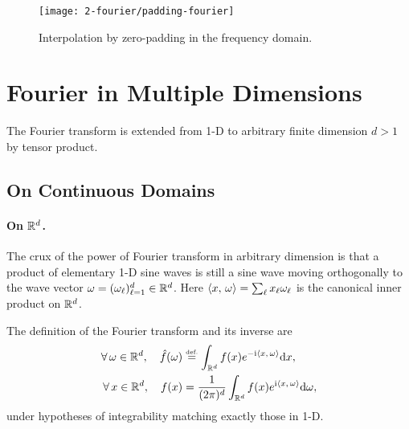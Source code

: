 \begin{figure}
\centering
\texttt{[image: 2-fourier/padding-fourier]}
\caption{\label{fig-padding-fourier}
Interpolation by zero-padding in the frequency domain.
}
\end{figure}

\section{Fourier in Multiple Dimensions}
\label{sec-fourier-multiple-dim}

The Fourier transform is extended from 1-D to arbitrary finite dimension $d>1$ by tensor product. 


\subsection{On Continuous Domains}

\paragraph{On $\mathbb{R}^d$.}

The crux of the power of Fourier transform in arbitrary dimension is that a product of elementary 1-D sine waves is still a sine wave
moving orthogonally to the wave vector $\omega=(\omega_\ell)_{\ell=1}^d \in \mathbb{R}^d$. Here $\langle x,\,\omega\rangle = \sum_\ell x_\ell \omega_\ell$ is the canonical inner product on $\mathbb{R}^d$. 

The definition of the Fourier transform and its inverse are 
\begin{align*}
	\forall \, \omega \in \mathbb{R}^d, \quad \hat f(\omega) &\stackrel{\mbox{\upshape\tiny def.}}{=} \int_{\mathbb{R}^d} f(x) e^{-\mathrm{i}\langle x,\,\omega\rangle} \mathrm{d} x, \\
	\forall \, x \in \mathbb{R}^d, \quad  f(x) &= \frac{1}{(2\pi)^d} \int_{\mathbb{R}^d} f(x) e^{\mathrm{i}\langle x,\,\omega\rangle} \mathrm{d} \omega,
\end{align*}
under hypotheses of integrability matching exactly those in 1-D.




